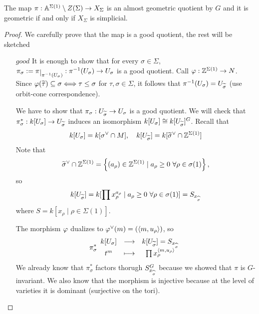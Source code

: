 \begin{theorem}[]\label{ThToricVarietiesAsAlmostGeometricQuotients}
The map $\pi:\mathbb{A}^{\Sigma(1)}\setminus Z(\Sigma)\to X_{\Sigma}$ is an almost geometric quotient by $G$ and it is geometric if and only if $X_\Sigma$ is simplicial.
\end{theorem}
\begin{proof}
We carefully prove that the map is a good quotient, the rest will be sketched
\setlength{\leftmargini}{0cm}
\begin{itemize}
\item[$\boxed{good}$] It is enough to show that for every $\sigma\in \Sigma$, $\pi_\sigma:=\pi\res{\pi\ii(U_\sigma)}:\pi\ii(U_\sigma)\to U_\sigma$ is a good quotient. Call $\varphi:\mathbb{Z}^{\Sigma(1)}\to N$. Since $\varphi(\widetilde{\tau})\subseteq \sigma\Longleftrightarrow \tau\leq \sigma$ for $\tau,\sigma\in \Sigma$, it follows that $\pi^{-1}(U_\sigma)=U_{\widetilde{\sigma}}$ (use orbit-cone correspondence).

We have to show that $\pi_\sigma:U_{\widetilde{\sigma}}\to U_\sigma$ is a good quotient. We will check that $\pi_\sigma^\ast:k[U_\sigma]\to U_{\widetilde{\sigma}}$ induces an isomorphism $k[U_\sigma]\cong k[U_{\widetilde{\sigma}}]^G$. Recall that
\[k[U_\sigma]=k[\sigma^\vee\cap M],\quad k[U_{\widetilde{\sigma}}]=k[\widetilde{\sigma}^\vee\cap \mathbb{Z}^{\Sigma(1)}]\]
Note that
\[\widetilde{\sigma}^\vee\cap \mathbb{Z}^{\Sigma(1)}=\left\{{(a_\rho)\in \mathbb{Z}^{\Sigma(1)}\mid a_\rho\geq 0\ \forall \rho\in \sigma(1)}\right\},\]
so
\[k[U_{\widetilde{\sigma}}]=k[\prod x_\rho^{a_\rho}\mid a_\rho\geq 0\ \forall \rho\in \sigma(1)]=S_{x_{\widehat{\sigma}}}\]
where $S=k[x_\rho\mid \rho\in \Sigma(1)]$.

The morphism $\varphi$ dualizes to $\varphi^\vee(m)=(\left\langle {m,u_\rho}\right\rangle)$, so
\[\pi_\sigma^\ast\begin{array}{ccc} {k[U_\sigma]} & \longrightarrow & {k[U_{\widetilde{\sigma}}]=S_{x_{\widehat{\sigma}}}}\\ {t^m} & \longmapsto & {\prod x_\rho^{\left\langle {m,u_\rho}\right\rangle}} \end{array}\]
We already know that $\pi_\sigma^\ast$ factors thorugh $S_{x_{\widehat{\sigma}}}^G$ because we showed that $\pi$ is $G$-invariant. We also know that the morphism is injective because at the level of varieties it is dominant (surjective on the tori). 


\end{itemize}
\end{proof}
